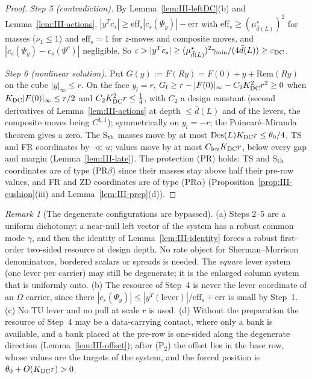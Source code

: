 \documentclass[10pt]{amsart}
\theoremstyle{definition}
\theoremstyle{remark}
\newtheorem{remark}[theorem]{Remark}
\begin{document}
\begin{proof}
\emph{Step 5 (contradiction).}  By Lemma~\ref{lem:III-leftDC}(b) and
Lemma~\ref{lem:III-actions}, $|y^Tc_s|\ge\mathrm{eff}_s|c_s(\Psi_y)|-\mathrm{err}$
with $\mathrm{eff}_s\ge(\mu^\star_{\bar d(L)})^2$ for masses ($\nu_1\le1$) and
$\mathrm{eff}_s=1$ for $z$-moves and composite moves, and $|c_s(\Psi_y)-
c_s(\Psi^c)|$ negligible.  So $\varepsilon>|y^Tc_s|\ge(\mu^\star_{\bar d(L)})^2
\gamma_{\min}/(4\bar d(L))\ge\varepsilon_{\rm DC}$.

\emph{Step 6 (nonlinear solution).}  Put $G(y):=F(Ry)=F(0)+y+\mathrm{Rem}(Ry)$
on the cube $|y|_\infty\le r$.  On the face $y_l=r$, $G_l\ge r-|F(0)|_\infty-
C_2K_{\rm DC}^2r^2\ge0$ when $K_{\rm DC}|F(0)|_\infty\le r/2$ and $C_2K_{\rm DC}^2r
\le\frac14$, with $C_2$ a design constant (second derivatives of
Lemma~\ref{lem:III-actions} at depth $\le\bar d(L)$ and of the levers, the
composite moves being $C^{1,1}$); symmetrically on $y_l=-r$; the
Poincar\'e--Miranda theorem gives a zero.  The S$_{\rm th}$ masses move by at most
$\mathrm{Des}(L)K_{\rm DC}r\le\theta_0/4$, TS and FR coordinates by $\ll u$;
values move by at most $C_{\rm lev}K_{\rm DC}r$, below every gap and margin
(Lemma~\ref{lem:III-late}).  The protection (PR) holds: TS and S$_{\rm th}$
coordinates are of type (PR$\beta$) since their masses stay above half their
pre-row values, and FR and ZD coordinates are of type (PR$\alpha$)
(Proposition~\ref{prop:III-cushion}(iii) and Lemma~\ref{lem:III-prep}(d)).
\end{proof}

\begin{remark}[The degenerate configurations are bypassed]\label{rem:III-SysDC}
(a) Steps 2--5 are a uniform dichotomy: a near-null left vector of the system
has a robust common mode $\gamma$, and then the identity of
Lemma~\ref{lem:III-identity} forces a robust first-order two-sided resource at
design depth.  No rate object for Sherman--Morrison denominators, bordered
scalars or spreads is needed.  The \emph{square} lever system (one lever per
carrier) may still be degenerate; it is the enlarged column system that is
uniformly onto.  (b) The resource of Step~4 is never the lever coordinate of an
$\Omega$ carrier, since there $|c_s(\Psi_y)|\le|y^T(\text{lever})|/\mathrm{eff}_s+
\mathrm{err}$ is small by Step~1.  (c) No TU lever and no pull at scale $r$ is
used.  (d) Without the preparation the resource of Step~4 may be a
data-carrying contact, where only a bank is available, and a bank placed at the
pre-row is one-sided along the degenerate direction
(Lemma~\ref{lem:III-offset}); after (P$_2$) the offset lies in the base row,
whose values are the targets of the system, and the forced position is
$\theta_0+O(K_{\rm DC}r)>0$.
\end{remark}
\end{document}
